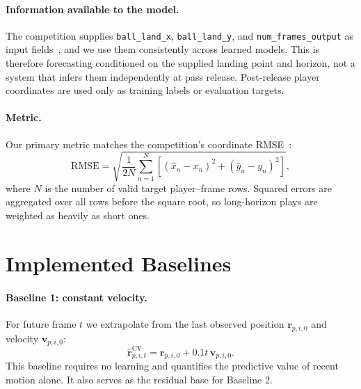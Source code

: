 \documentclass{article}
\begin{document}
\paragraph{Information available to the model.}
The competition supplies \texttt{ball\_land\_x}, \texttt{ball\_land\_y}, and
\texttt{num\_frames\_output} as input fields~\cite{data}, and we use them
consistently across learned models. This is therefore forecasting conditioned on the
supplied landing point and horizon, not a system that infers them independently at
pass release. Post-release player coordinates are used only as training labels or
evaluation targets.

\paragraph{Metric.}
Our primary metric matches the competition's coordinate RMSE~\cite{competition}:
\begin{equation}
 \mathrm{RMSE}
 =\sqrt{\frac{1}{2N}\sum_{n=1}^{N}
 \left[(\widehat{x}_{n}-x_{n})^{2}+(\widehat{y}_{n}-y_{n})^{2}\right]},
 \label{eq:rmse}
\end{equation}
where $N$ is the number of valid target player--frame rows. Squared errors are
aggregated over all rows before the square root, so long-horizon plays are weighted
as heavily as short ones.

\section{Implemented Baselines}
\label{sec:baselines}

\paragraph{Baseline 1: constant velocity.}
For future frame $t$ we extrapolate from the last observed position
$\mathbf{r}_{p,i,0}$ and velocity $\mathbf{v}_{p,i,0}$:
\begin{equation}
 \widehat{\mathbf{r}}^{\mathrm{CV}}_{p,i,t}
 = \mathbf{r}_{p,i,0}+0.1t\,\mathbf{v}_{p,i,0}.
 \label{eq:cv}
\end{equation}
This baseline requires no learning and quantifies the predictive value of recent
motion alone. It also serves as the residual base for Baseline 2.
\end{document}
